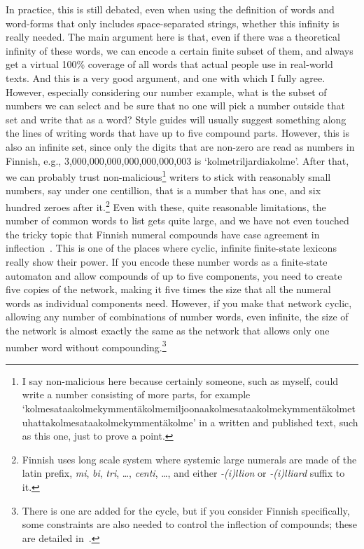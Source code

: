 \documentclass[officiallayout,final]{unihelcompling}
\begin{document}
In practice, this is still debated, even when using the definition of words and
word-forms that only includes space-separated strings, whether this infinity is
really needed. The main argument here is that, even if there was a theoretical
infinity of these words, we can encode a certain finite subset of them, and
always get a virtual 100\% coverage of all words that actual people use in
real-world texts. And this is a very good argument, and one with which I fully
agree. However, especially considering our number example, what is the subset
of numbers we can select and be sure that no one will pick a number outside
that set and write that as a word? Style guides will usually suggest something
along the lines of writing words that have up to five compound parts.  However,
this is also an infinite set, since only the digits that are non-zero are read
as numbers in Finnish, e.g., 3,000,000,000,000,000,000,003 is
`kolmetriljardiakolme'. After that, we can probably trust
non-malicious\footnote{I say non-malicious here because certainly someone, such
    as myself, could write a number consisting of more parts, for example
    `kolmesataakolmekymmentäkolmemiljoonaakolmesataakolmekymmentäkolmetuhattakolmesataakolmekymmentäkolme'
in a written and published text, such as this one, just to prove a point.}
writers to stick with reasonably small numbers, say under one centillion, that
is a number that has one, and six hundred zeroes after it.\footnote{Finnish
    uses long scale system where systemic large numerals are made of the latin
    prefix, \emph{mi}, \emph{bi}, \emph{tri}, \ldots, \emph{centi}, \ldots, and
either \emph{-(i)llion} or \emph{-(i)lliard} suffix to it.} Even with these,
quite reasonable limitations, the number of common words to list gets quite
large, and we have not even touched the tricky topic that Finnish numeral
compounds have case agreement in inflection~\citep{karttunen2006numbers}. This
is one of the places where cyclic, infinite finite-state lexicons really show
their power.  If you encode these number words as a \gls{finite-state
automaton} and allow compounds of up to five components, you need to create
five copies of the network, making it five times the size that all the numeral
words as individual components need.  However, if you make that network cyclic,
allowing any number of combinations of number words, even infinite, the size of
the network is almost exactly the same as the network that allows only one
number word without compounding.\footnote{There is one arc added for the cycle,
but if you consider Finnish specifically, some constraints are also needed to
control the inflection of compounds; these are detailed
in~\citet{karttunen2006numbers}.}
\end{document}
